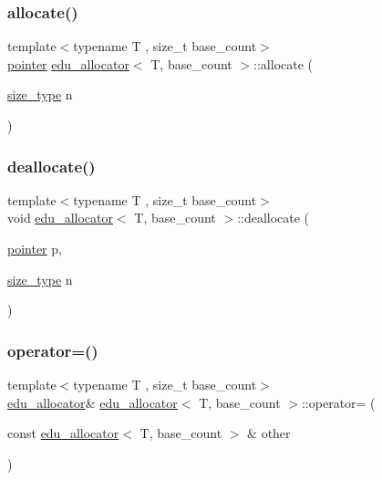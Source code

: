 \subsubsection{\texorpdfstring{allocate()}{allocate()}}
{\footnotesize\ttfamily template$<$typename T , size\+\_\+t base\+\_\+count$>$ \\
\hyperlink{classedu__allocator_a735857fd1d42cae69aef990a62e597cf}{pointer} \hyperlink{classedu__allocator}{edu\+\_\+allocator}$<$ T, base\+\_\+count $>$\+::allocate (\begin{DoxyParamCaption}\item[{\hyperlink{classedu__allocator_aa140c3e2a9364dcbc207fa148b5c1deb}{size\+\_\+type}}]{n }\end{DoxyParamCaption})\hspace{0.3cm}{\ttfamily [inline]}}

\mbox{\label{classedu__allocator_a4536512dd171e8fb38bed090aa964f34}} 
\subsubsection{\texorpdfstring{deallocate()}{deallocate()}}
{\footnotesize\ttfamily template$<$typename T , size\+\_\+t base\+\_\+count$>$ \\
void \hyperlink{classedu__allocator}{edu\+\_\+allocator}$<$ T, base\+\_\+count $>$\+::deallocate (\begin{DoxyParamCaption}\item[{\hyperlink{classedu__allocator_a735857fd1d42cae69aef990a62e597cf}{pointer}}]{p,  }\item[{\hyperlink{classedu__allocator_aa140c3e2a9364dcbc207fa148b5c1deb}{size\+\_\+type}}]{n }\end{DoxyParamCaption})\hspace{0.3cm}{\ttfamily [inline]}}

\mbox{\label{classedu__allocator_a74205dc4ce395a099bb364e84ddb023e}} 
\subsubsection{\texorpdfstring{operator=()}{operator=()}\hspace{0.1cm}{\footnotesize\ttfamily [1/2]}}
{\footnotesize\ttfamily template$<$typename T , size\+\_\+t base\+\_\+count$>$ \\
\hyperlink{classedu__allocator}{edu\+\_\+allocator}\& \hyperlink{classedu__allocator}{edu\+\_\+allocator}$<$ T, base\+\_\+count $>$\+::operator= (\begin{DoxyParamCaption}\item[{const \hyperlink{classedu__allocator}{edu\+\_\+allocator}$<$ T, base\+\_\+count $>$ \&}]{other }\end{DoxyParamCaption})\hspace{0.3cm}{\ttfamily [delete]}}

